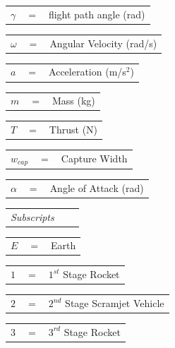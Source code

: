 \begin{tabular}{p{1.2cm}p{1cm}p{5cm}}
	$\gamma$ & $=$ & flight path angle (rad)\\
\end{tabular} 
\begin{tabular}{p{1.2cm}p{1cm}p{5cm}}
	$\omega$ & $=$ & Angular Velocity (rad/s)\\
\end{tabular} 
\begin{tabular}{p{1.2cm}p{1cm}p{5cm}}
	$a$ & $=$ & Acceleration (m/s$^2$)\\
\end{tabular} 
\begin{tabular}{p{1.2cm}p{1cm}p{5cm}}
	$m$ & $=$ & Mass (kg)\\
\end{tabular} 
\begin{tabular}{p{1.2cm}p{1cm}p{5cm}}
	$T$ & $=$ & Thrust (N)\\
\end{tabular} 
\begin{tabular}{p{1.2cm}p{1cm}p{5cm}}
	$w_{cap}$ & $=$ & Capture Width\\
\end{tabular} 
\begin{tabular}{p{1.2cm}p{1cm}p{5cm}}
	$\alpha$ & $=$ & Angle of Attack (rad)\\
\end{tabular} 	
\newline  	
\begin{tabular}{p{5.2cm}p{1cm}p{5cm}}
	
	
	\textit{Subscripts} \\
\end{tabular} 
\newline
\begin{tabular}{p{1.2cm}p{1cm}p{5cm}}
	$E$ & $=$ & Earth\\
	
\end{tabular} 
\begin{tabular}{p{1.2cm}p{1cm}p{5cm}}
	$1$ & $=$ & $1^{st}$ Stage Rocket\\
\end{tabular} 
\begin{tabular}{p{1.2cm}p{1cm}p{5cm}}
	$2$ & $=$ & $2^{nd}$ Stage Scramjet Vehicle\\
\end{tabular} 
\begin{tabular}{p{1.2cm}p{1cm}p{5cm}}
	$3$ & $=$ & $3^{rd}$ Stage Rocket\\
\end{tabular} 
